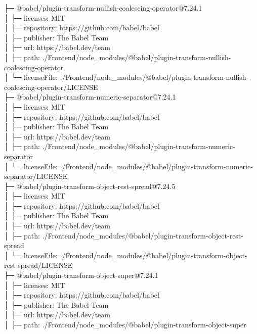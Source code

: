 \documentclass[
    paper=a4,
    twoside=false,
    parskip=half,
    listof=entryprefix,
    listof=totoc,
    index=totoc,
    bibliography=totoc,
    headsepline,
]{scrbook}
\begin{document}
    ├─ @babel/plugin-transform-nullish-coalescing-operator@7.24.1\\
    │  ├─ licenses: MIT\\
    │  ├─ repository: https://github.com/babel/babel\\
    │  ├─ publisher: The Babel Team\\
    │  ├─ url: https://babel.dev/team\\
    │  ├─ path: ./Frontend/node\_modules/@babel/plugin-transform-nullish-coalescing-operator\\
    │  └─ licenseFile: ./Frontend/node\_modules/@babel/plugin-transform-nullish-coalescing-operator/LICENSE\\
    ├─ @babel/plugin-transform-numeric-separator@7.24.1\\
    │  ├─ licenses: MIT\\
    │  ├─ repository: https://github.com/babel/babel\\
    │  ├─ publisher: The Babel Team\\
    │  ├─ url: https://babel.dev/team\\
    │  ├─ path: ./Frontend/node\_modules/@babel/plugin-transform-numeric-separator\\
    │  └─ licenseFile: ./Frontend/node\_modules/@babel/plugin-transform-numeric-separator/LICENSE\\
    ├─ @babel/plugin-transform-object-rest-spread@7.24.5\\
    │  ├─ licenses: MIT\\
    │  ├─ repository: https://github.com/babel/babel\\
    │  ├─ publisher: The Babel Team\\
    │  ├─ url: https://babel.dev/team\\
    │  ├─ path: ./Frontend/node\_modules/@babel/plugin-transform-object-rest-spread\\
    │  └─ licenseFile: ./Frontend/node\_modules/@babel/plugin-transform-object-rest-spread/LICENSE\\
    ├─ @babel/plugin-transform-object-super@7.24.1\\
    │  ├─ licenses: MIT\\
    │  ├─ repository: https://github.com/babel/babel\\
    │  ├─ publisher: The Babel Team\\
    │  ├─ url: https://babel.dev/team\\
    │  ├─ path: ./Frontend/node\_modules/@babel/plugin-transform-object-super\\
\end{document}
